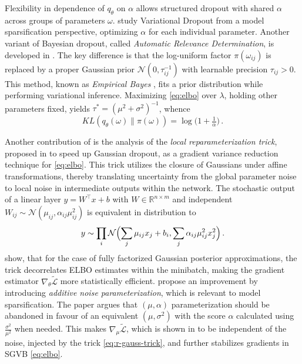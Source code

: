 \documentclass[a4paper,10pt]{article}
\begin{document}
Flexibility in dependence of $q_\theta$ on $\alpha$ allows structured dropout with shared
$\alpha$ across groups of parameters $\omega$. \cite{molchanov_variational_2017} study
Variational Dropout from a model sparsification perspective, optimizing $\alpha$ for each
individual parameter. Another variant of Bayesian dropout, called \textit{Automatic Relevance
Determination}, is developed in \cite{kharitonov_variational_2018}. The key difference is
that the log-uniform factor $\pi(\omega_{ij})$ is replaced by a proper Gaussian prior $
  \mathcal{N}(0, \tau^{-1}_{ij})
$ with learnable precision $\tau_{ij} > 0$. This method, known as \textit{Empirical Bayes}
\cite{citation_needed}, fits a prior distribution while performing variational inference.
Maximizing \eqref{eq:elbo} over $\lambda$, holding other parameters fixed, yields $
  \tau^* = {(\mu^2 + \sigma^2)}^{-1}
$, whence
\begin{equation}  \label{eq:ard-kl-div-real}
  KL(q_\theta(\omega) \| \pi(\omega))
    = \log{\bigl(1 + \tfrac1{\alpha} \bigr)}
    \,.
\end{equation}

Another contribution of \cite{kingma_variational_2015} is the analysis of the \textit{local
reparameterization trick}, proposed in \cite{wang_fast_2013} to speed up Gaussian dropout,
as a gradient variance reduction technique for \eqref{eq:elbo}. This trick utilizes the
closure of Gaussians under affine transformations, thereby translating uncertainty from the
global parameter noise to local noise in intermediate outputs within the network.
%
The stochastic output of a linear layer $
  y = W^\top x + b
$ with $
  W \in \mathbb{R}^{n\times m}
$ and independent $
  W_{ij} \sim \mathcal{N}(\mu_{ij}, \alpha_{ij} \mu_{ij}^2)
$ is equivalent in distribution to
\begin{equation} \label{eq:r-gauss-trick}
    y \sim \prod_i \mathcal{N}\Bigl(
          \sum_j \mu_{ij} x_j + b_i,
          \sum_j \alpha_{ij} \mu_{ij}^2 x_j^2
      \Bigr)
    \,.
\end{equation}
%
\cite{kingma_variational_2015} show, that for the case of fully factorized Gaussian
posterior approximations, the trick decorrelates ELBO estimates within the minibatch,
making the gradient estimator $\nabla_\theta \tilde{\mathcal{L}}$ more statistically
efficient. \cite{molchanov_variational_2017} propose an improvement by introducing
\textit{additive noise parameterization}, which is relevant to model sparsification.
The paper argues that $(\mu, \alpha)$ parameterization should be abandoned in favour
of an equivalent $(\mu, \sigma^2)$ with the score $\alpha$ calculated using $
  \tfrac{\sigma^2}{\mu^2}
$ when needed. This makes $
  \nabla_\mu \tilde{\mathcal{L}}
$, which is shown in \cite{molchanov_variational_2017} to be independent of the noise,
injected by the trick \eqref{eq:r-gauss-trick}, and further stabilizes gradients in SGVB
\eqref{eq:elbo}.
\end{document}
